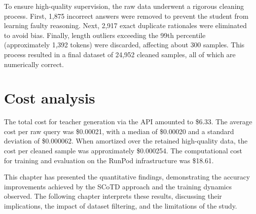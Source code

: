 To ensure high-quality supervision, the raw data underwent a rigorous cleaning process. First, 1{,}875 incorrect answers were removed to prevent the student from learning faulty reasoning. Next, 2{,}917 exact duplicate rationales were eliminated to avoid bias. Finally, length outliers exceeding the 99th percentile (approximately 1{,}392 tokens) were discarded, affecting about 300 samples. This process resulted in a final dataset of 24{,}952 cleaned samples, all of which are numerically correct.

\section{Cost analysis}
The total cost for teacher generation via the API amounted to \$6.33. The average cost per raw query was \$0.00021, with a median of \$0.00020 and a standard deviation of \$0.000062. When amortized over the retained high-quality data, the cost per cleaned sample was approximately \$0.000254. The computational cost for training and evaluation on the RunPod infrastructure was \$18.61.

This chapter has presented the quantitative findings, demonstrating the accuracy improvements achieved by the SCoTD approach and the training dynamics observed. The following chapter interprets these results, discussing their implications, the impact of dataset filtering, and the limitations of the study.
